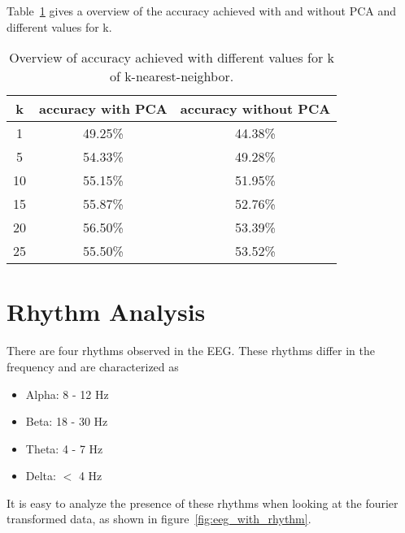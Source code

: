 Table~\ref{tab:error_validation_overview} gives a overview of the accuracy achieved with and without PCA and different values for k.

\begin{table}
	\centering
	\begin{tabular}{c|c|c}
		k & accuracy with PCA & accuracy without PCA \\
		\hline
		1  & 49.25\% & 44.38\% \\
		5  & 54.33\% & 49.28\% \\
		10 & 55.15\% & 51.95\% \\
		15 & 55.87\% & 52.76\% \\
		20 & 56.50\% & 53.39\% \\
		25 & 55.50\% & 53.52\% \\
	\end{tabular}
	\caption{Overview of accuracy achieved with different values for k of k-nearest-neighbor.}
	\label{tab:error_validation_overview}
\end{table}


\section{Rhythm Analysis}
There are four rhythms observed in the EEG\cite[chapter~11]{Ganong1997}. These rhythms differ in the frequency and are characterized as

\begin{itemize}
	\item Alpha: 8 - 12 Hz
	\item Beta: 18 - 30 Hz
	\item Theta: 4 - 7 Hz
	\item Delta: $<$ 4 Hz
\end{itemize}

It is easy to analyze the presence of these rhythms when looking at the fourier transformed data, as shown in figure~\ref{fig:eeg_with_rhythm}.

